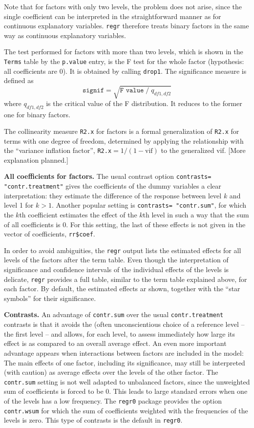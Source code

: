\documentclass{article}
\providecommand{\T}{\texttt}
\providecommand{\Tit}[1]{\textbf{#1}\hspace{1em}}
\begin{document}
Note that for factors with only two levels, the problem does not arise,
since the single 
coefficient can be interpreted in the straightforward manner as 
for continuous explanatory variables. \T{regr} therefore treats binary
factors in the same way as continuous explanatory variables.

The test performed for factors with more than two levels, which is shown 
in the \T{Terms} table by the \T{p.value} entry, 
is the F test for the whole factor (hypothesis: all coefficients are 0). 
It is obtained by calling \T{drop1}.
The significance measure is defined as 
\[
  \T{signif} = \sqrt{\T{F value}\;/\;q_{df1,df2}}
\]
where $q_{df1,df2}$ is the critical value of the F distribution.
It reduces to the former one for binary factors.

The collinearity measure \T{R2.x} for factors is a formal generalization of 
\T{R2.x} for terms with one degree of freedom, determined by applying
the relationship with the ``variance inflation factor'',
\T{R2.x}$=1/(1-\mbox{vif})$ to the generalized vif. 
[More explanation planned.]

\Tit{All coefficients for factors.}
The usual contrast option \T{contrasts=%
"contr.treatment"} gives the coefficients of the dummy variables 
a clear interpretation: 
they estimate the difference of the response between level $k$ and 
level 1 for $k>1$.
Another popular setting is \T{contrasts=%
"contr.sum"}, for which the $k$th coefficient estimates the effect 
of the $k$th level in such a way that the sum of all coefficients is 0.
For this setting, the last of these effects is not given in the
vector of coefficients, \T{rr\$coef}.

In order to avoid ambiguities, the \T{regr} output lists the 
estimated effects for all levels of the factors after the term table.
Even though the interpretation of significance and confidence intervals of
the individual effects of the levels is delicate, \T{regr} provides a full 
table, similar to the term table explained above, for each factor.
By default, the estimated effects ar shown, together with the
``star symbols'' for their significance.

\Tit{Contrasts.}
An advantage of \T{contr.sum} over the usual \T{contr.treatment}
contrasts is that it avoids the (often unconscientious choice of a
reference level -- the first level -- and allows, for each level, 
to assess immediately how large its effect is as compared to an overall
average effect.
An even more important advantage appears when interactions between factors
are included in the model: 
The main effects of one factor, including its significance, 
may still be interpreted (with caution) as average effects over the
levels of the other factor.
The \T{contr.sum} setting is not well adapted to unbalanced factors, since
the unweighted sum of coefficients is forced to be 0.
This leads to large standard errors when one of the levels has a low 
frequency. 
The \T{regr0} package provides the option \T{contr.wsum} for which the
sum of coefficients weighted with the frequencies of the levels is zero.
This type of contrasts is the default in \T{regr0}.
\end{document}
